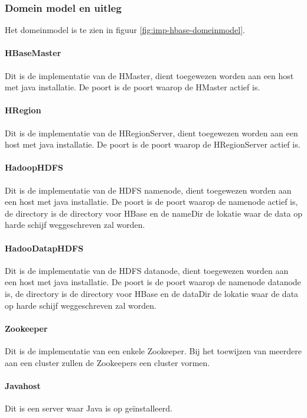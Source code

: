 \subsubsection{Domein model en uitleg}
Het domeinmodel is te zien in figuur \ref{fig:imp-hbase-domeinmodel}.

\paragraph{HBaseMaster} Dit is de implementatie van de HMaster, dient toegewezen worden aan een host met java installatie. De poort is de poort waarop de HMaster actief is. 
 
\paragraph{HRegion} Dit is de implementatie van de HRegionServer, dient toegewezen worden aan een host met java installatie. De poort is de poort waarop de HRegionServer actief is. 

\paragraph{HadoopHDFS} Dit is de implementatie van de HDFS namenode, dient toegewezen worden aan een host met java installatie. De poort is de poort waarop de namenode actief is, de directory is de directory voor HBase  en de nameDir de lokatie waar de data op harde schijf weggeschreven zal worden. 

\paragraph{HadooDatapHDFS} Dit is de implementatie van de HDFS datanode, dient toegewezen worden aan een host met java installatie. De poort is de poort waarop de namenode datanode is, de directory is de directory voor HBase en de dataDir de lokatie waar de data op harde schijf weggeschreven zal worden. 

\paragraph{Zookeeper} Dit is de implementatie van een enkele Zookeeper. Bij het toewijzen van meerdere aan een cluster zullen de Zookeepers een cluster vormen. 

\paragraph{Javahost} Dit is een server waar Java is op geïnstalleerd. 

